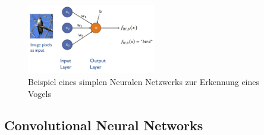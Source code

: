 \documentclass[a4paper]{article}
\begin{document}
		\newpage
		
		\begin{figure}[htb!]
			\centering
			\includegraphics[width=0.5\textwidth]{img/07_convolutional_nn/nn_birb.png}
			\caption{Beispiel eines simplen Neuralen Netzwerks zur Erkennung eines Vogels}
		\end{figure}
	
		\subsection{Convolutional Neural Networks}
	
\end{document}
